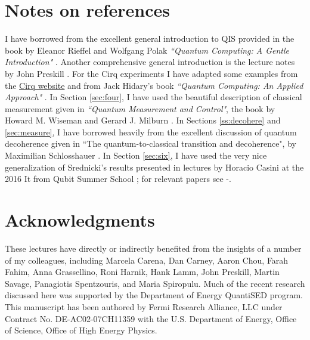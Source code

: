 \documentclass[a4paper,11pt]{article}
\begin{document}
\section*{Notes on references}
I have borrowed from the excellent general introduction to QIS provided in the book by 
Eleanor Rieffel and Wolfgang Polak {\it ``Quantum Computing: A Gentle Introduction"} \cite{Rieffel}.
Another comprehensive general introduction is the lecture notes by John Preskill \cite{preskill}.
For the Cirq experiments
I have adapted some examples from the \href{https://cirq.readthedocs.io/en/stable/}{Cirq website} and from Jack Hidary's book {\it ``Quantum Computing: An Applied Approach"} \cite{Hidary}.
In Section \ref{sec:four},
I have used the beautiful description of classical measurement given in {\it ``Quantum Measurement and Control"}, the book by Howard M. Wiseman
and Gerard J. Milburn \cite{Wiseman}.
In Sections \ref{ss:decohere} and  \ref{sec:measure},
I have borrowed heavily from the excellent discussion of quantum decoherence given in ``The quantum-to-classical transition and decoherence",  
by Maximilian Schlosshauer \cite{Schlosshauer:2014pgr}.
In Section \ref{sec:six},
I have used the very nice generalization of Srednicki's results presented in lectures by Horacio Casini at the 2016 It from Qubit Summer School \cite{Casini};
for relevant papers see \cite{Calabrese:2004eu}-\cite{Casini:2014yca}.

\section*{Acknowledgments}
These lectures have directly or indirectly benefited from the insights of a number of my colleagues, including Marcela Carena, Dan Carney, Aaron Chou, 
Farah Fahim, Anna Grassellino, Roni Harnik, Hank Lamm, John Preskill, Martin Savage, Panagiotis Spentzouris, and Maria Spiropulu.
Much of the recent research discussed here was supported by the Department of Energy QuantiSED program. 
This manuscript has been authored by Fermi Research Alliance, LLC under Contract No. DE-AC02-07CH11359 with the U.S. Department of Energy, Office of Science, Office of High Energy Physics. 
\end{document}
